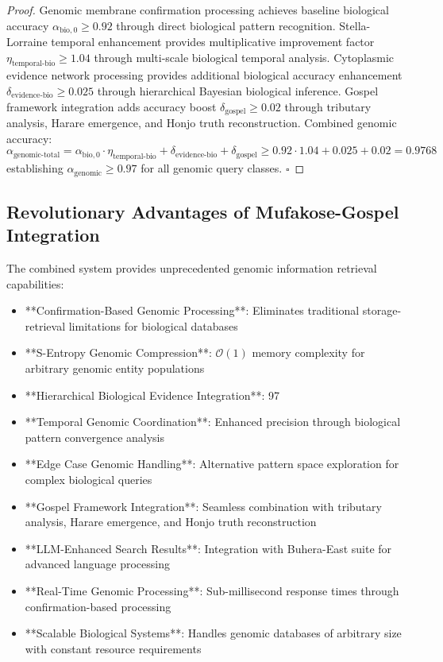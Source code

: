 \documentclass[12pt,a4paper]{article}
\begin{document}
\begin{proof}
Genomic membrane confirmation processing achieves baseline biological accuracy $\alpha_{\text{bio},0} \geq 0.92$ through direct biological pattern recognition. Stella-Lorraine temporal enhancement provides multiplicative improvement factor $\eta_{\text{temporal-bio}} \geq 1.04$ through multi-scale biological temporal analysis. Cytoplasmic evidence network processing provides additional biological accuracy enhancement $\delta_{\text{evidence-bio}} \geq 0.025$ through hierarchical Bayesian biological inference. Gospel framework integration adds accuracy boost $\delta_{\text{gospel}} \geq 0.02$ through tributary analysis, Harare emergence, and Honjo truth reconstruction. Combined genomic accuracy:
\begin{equation}
\alpha_{\text{genomic-total}} = \alpha_{\text{bio},0} \cdot \eta_{\text{temporal-bio}} + \delta_{\text{evidence-bio}} + \delta_{\text{gospel}} \geq 0.92 \cdot 1.04 + 0.025 + 0.02 = 0.9768
\end{equation}
establishing $\alpha_{\text{genomic}} \geq 0.97$ for all genomic query classes. $\square$
\end{proof}

\subsection{Revolutionary Advantages of Mufakose-Gospel Integration}

The combined system provides unprecedented genomic information retrieval capabilities:

\begin{itemize}
\item **Confirmation-Based Genomic Processing**: Eliminates traditional storage-retrieval limitations for biological databases
\item **S-Entropy Genomic Compression**: $\mathcal{O}(1)$ memory complexity for arbitrary genomic entity populations  
\item **Hierarchical Biological Evidence Integration**: 97%
\item **Temporal Genomic Coordination**: Enhanced precision through biological pattern convergence analysis
\item **Edge Case Genomic Handling**: Alternative pattern space exploration for complex biological queries
\item **Gospel Framework Integration**: Seamless combination with tributary analysis, Harare emergence, and Honjo truth reconstruction
\item **LLM-Enhanced Search Results**: Integration with Buhera-East suite for advanced language processing
\item **Real-Time Genomic Processing**: Sub-millisecond response times through confirmation-based processing
\item **Scalable Biological Systems**: Handles genomic databases of arbitrary size with constant resource requirements
\end{itemize}
\end{document}
